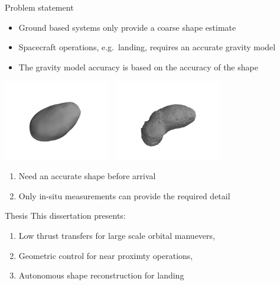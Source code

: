 \begin{frame}[t]{Problem statement}
    \begin{itemize}
        \item Ground based systems only provide a coarse shape estimate
        \item Spacecraft operations, e.g.\ landing, requires an accurate gravity model
        \item The gravity model accuracy is based on the accuracy of the shape
    \end{itemize}
    \pause
    \begin{center}
    \includegraphics[trim={25cm 15cm 25cm 15cm},clip,width=0.35\textwidth,height=0.5\textheight,keepaspectratio]{figures/mathematical_background/itokawa_radar_isometric.jpg}~
    \includegraphics[trim={25cm 12cm 25cm 15cm},clip,width=0.35\textwidth,height=0.5\textheight,keepaspectratio]{figures/mathematical_background/itokawa_isometric.jpg}
    \end{center}
    \begin{block}{}
        \begin{center}
            \begin{enumerate}
                \item Need an accurate shape before arrival
                \item Only in-situ measurements can provide the required detail
            \end{enumerate}
        \end{center}
    \end{block}
    
\end{frame}

\begin{frame}{Thesis}
    This dissertation presents:
    \pause
    \begin{enumerate}
        \item Low thrust transfers for large scale orbital manuevers,
            \pause
        \item Geometric control for near proximty operations,
            \pause
        \item Autonomous shape reconstruction for landing 
    \end{enumerate}
\end{frame}



